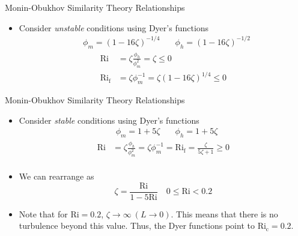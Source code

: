 \begin{frame}{Monin-Obukhov Similarity Theory Relationships}

\begin{itemize}
	\item Consider \textit{unstable} conditions using Dyer's functions
	\begin{align*}
	& \phi_m = \left(1 - 16\zeta\right)^{-1/4} & \quad  \phi_h = \left(1 - 16\zeta\right)^{-1/2}
	\end{align*}
	\begin{align*}
		\mathrm{Ri} &= \zeta \frac{\phi_h}{\phi_m^2} = \zeta \leq 0\\
		\mathrm{Ri_f} &= \zeta \phi_m^{-1} = \zeta(1-16\zeta)^{1/4} \leq 0
	\end{align*}
\end{itemize}
\end{frame}
\begin{frame}{Monin-Obukhov Similarity Theory Relationships}

\begin{itemize}
	\item Consider \textit{stable} conditions using Dyer's functions
	\begin{align*}
	& \phi_m = 1 + 5\zeta & \quad  \phi_h = 1 + 5\zeta
	\end{align*}
	\begin{align*}
		\mathrm{Ri} &= \zeta \frac{\phi_h}{\phi_m^2} = \zeta \phi_m^{-1} = \mathrm{Ri_f} = \frac{\zeta}{5\zeta + 1} \geq 0 \\
	\end{align*}
	\item We can rearrange as
	$$\zeta = \frac{\mathrm{Ri}}{1 -5\mathrm{Ri}} \quad 0\leq \mathrm{Ri} < 0.2$$
	\item Note that for $\mathrm{Ri} = 0.2$, $\zeta \rightarrow \infty\ (L\rightarrow 0)$. This means that there is no turbulence beyond this value. Thus, the Dyer functions point to $\mathrm{Ri_c} = 0.2$.
\end{itemize}
\end{frame}
